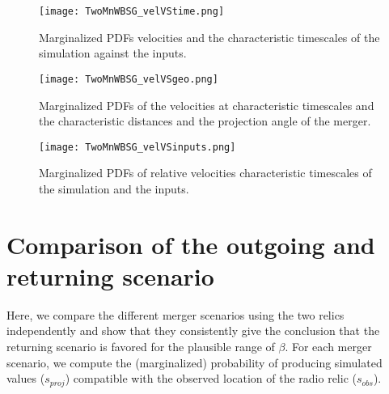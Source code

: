 \documentclass[ucdthesis.tex]{subfiles}
\begin{document}
    \begin{figure*}
    \begin{minipage}{180mm}
    	\begin{center}
    	\texttt{[image: TwoMnWBSG\_velVStime.png]}
    	\caption{Marginalized PDFs velocities and the characteristic timescales
    	of the simulation against the inputs.}
    	\end{center}
    \end{minipage}
    \end{figure*}
    \begin{figure*}
    \begin{minipage}{180mm}
    	\begin{center}
    	\texttt{[image: TwoMnWBSG\_velVSgeo.png]}
    	\caption{Marginalized PDFs of the velocities at characteristic timescales
    		and the characteristic distances and the projection angle of the merger. }
    	\end{center}
    \end{minipage}
    \end{figure*}
    \begin{figure*}
    \begin{minipage}{180mm}
    	\begin{center}
    	\texttt{[image: TwoMnWBSG\_velVSinputs.png]}
    	\caption{Marginalized PDFs of relative velocities characteristic
    	timescales of the simulation and the inputs.}
    	\end{center}
    \end{minipage}
    \end{figure*}
    
    \section{Comparison of the outgoing and returning scenario}
    \label{app:Bayes_factor}
    Here, we compare the different merger scenarios using the two relics
    independently and show that they consistently give the conclusion that the returning
    scenario is favored for the plausible range of $\beta$. For each merger
    scenario, we compute
    the (marginalized) probability of producing simulated
    values ($s_{proj}$) compatible with the observed location of the radio
    relic ($s_{obs}$). 
    
\end{document}
